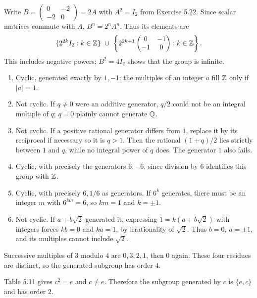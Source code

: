 
Write $B=\begin{pmatrix}0&-2\\-2&0\end{pmatrix}=2A$ with $A^2=I_2$ from Exercise 5.22. Since scalar matrices commute with $A$, $B^n=2^n A^n$. Thus its elements are
\[\{2^{2k}I_2:k\in\Z\}\ \cup\ \left\{2^{2k+1}\begin{pmatrix}0&-1\\-1&0\end{pmatrix}:k\in\Z\right\}.
\]
This includes negative powers; $B^2=4I_2$ shows that the group is infinite.


\begin{enumerate}[label=$G_{\arabic*}:$]
\item Cyclic, generated exactly by $1,-1$: the multiples of an integer $a$ fill $\mathbb{Z}$ only if $|a|=1$.
\item Not cyclic. If $q\ne0$ were an additive generator, $q/2$ could not be an integral multiple of $q$; $q=0$ plainly cannot generate $\mathbb{Q}$.
\item Not cyclic. If a positive rational generator differs from $1$, replace it by its reciprocal if necessary so it is $q>1$. Then the rational $(1+q)/2$ lies strictly between $1$ and $q$, while no integral power of $q$ does. The generator $1$ also fails.
\item Cyclic, with precisely the generators $6,-6$, since division by $6$ identifies this group with $\mathbb{Z}$.
\item Cyclic, with precisely $6,1/6$ as generators. If $6^k$ generates, there must be an integer $m$ with $6^{km}=6$, so $km=1$ and $k=\pm1$.
\item Not cyclic. If $a+b\sqrt2$ generated it, expressing $1=k(a+b\sqrt2)$ with integers forces $kb=0$ and $ka=1$, by irrationality of $\sqrt2$. Thus $b=0$, $a=\pm1$, and its multiples cannot include $\sqrt2$.
\end{enumerate}


Successive multiples of $3$ modulo $4$ are $0,3,2,1$, then $0$ again. These four residues are distinct, so the generated subgroup has order $4$.


Table 5.11 gives $c^2=e$ and $c\ne e$. Therefore the subgroup generated by $c$ is $\{e,c\}$ and has order $2$.

